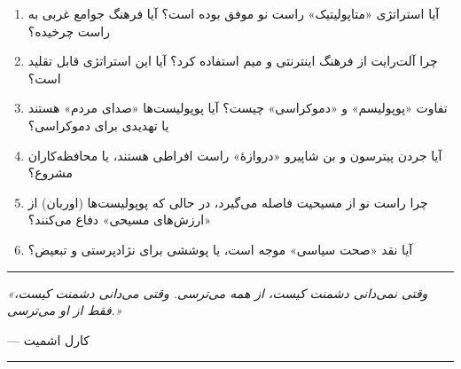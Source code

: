 \begin{tcolorbox}[
    enhanced,
    colback=centergreen!8,
    colframe=centergreen,
    boxrule=1.5pt,
    arc=5pt,
    fonttitle=\bfseries,
    title={\rl{❓ پرسش‌هایی برای تأمل و بحث}}
]
\begin{enumerate}
    \item آیا استراتژی «متاپولیتیک» راست نو موفق بوده است؟ آیا فرهنگ جوامع غربی به راست چرخیده؟
    
    \item چرا آلت‌رایت از فرهنگ اینترنتی و میم استفاده کرد؟ آیا این استراتژی قابل تقلید است؟
    
    \item تفاوت «پوپولیسم» و «دموکراسی» چیست؟ آیا پوپولیست‌ها «صدای مردم» هستند یا تهدیدی برای دموکراسی؟
    
    \item آیا جردن پیترسون و بن شاپیرو «دروازهٔ» راست افراطی هستند، یا محافظه‌کاران مشروع؟
    
    \item چرا راست نو از مسیحیت فاصله می‌گیرد، در حالی که پوپولیست‌ها (اوربان) از «ارزش‌های مسیحی» دفاع می‌کنند؟
    
    \item آیا نقد «صحت سیاسی» موجه است، یا پوششی برای نژادپرستی و تبعیض؟
\end{enumerate}
\end{tcolorbox}

\vspace{10mm}
\begin{center}
\rule{0.6\textwidth}{1pt}

\vspace{3mm}
\textit{«وقتی نمی‌دانی دشمنت کیست، از همه می‌ترسی. وقتی می‌دانی دشمنت کیست، فقط از او می‌ترسی.»}

\vspace{2mm}
--- کارل اشمیت

\vspace{3mm}
\rule{0.6\textwidth}{1pt}
\end{center}
